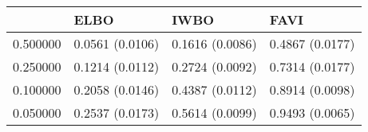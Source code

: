 \begin{tabular}{llll}
\toprule
 & ELBO & IWBO & FAVI \\
\midrule
0.500000 & 0.0561 (0.0106) & 0.1616 (0.0086) & 0.4867 (0.0177) \\
0.250000 & 0.1214 (0.0112) & 0.2724 (0.0092) & 0.7314 (0.0177) \\
0.100000 & 0.2058 (0.0146) & 0.4387 (0.0112) & 0.8914 (0.0098) \\
0.050000 & 0.2537 (0.0173) & 0.5614 (0.0099) & 0.9493 (0.0065) \\
\bottomrule
\end{tabular}
